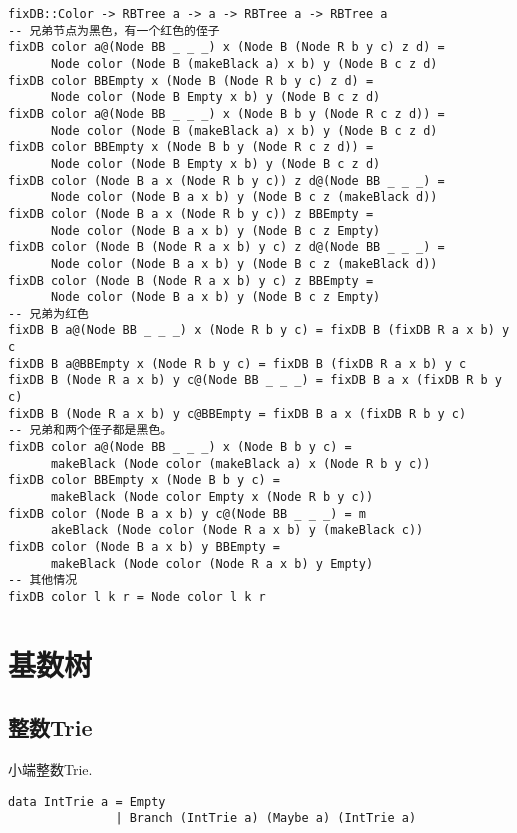 \documentclass{ctexart}
\begin{document}
\begin{lstlisting}
fixDB::Color -> RBTree a -> a -> RBTree a -> RBTree a
-- 兄弟节点为黑色，有一个红色的侄子
fixDB color a@(Node BB _ _ _) x (Node B (Node R b y c) z d) =
      Node color (Node B (makeBlack a) x b) y (Node B c z d)
fixDB color BBEmpty x (Node B (Node R b y c) z d) =
      Node color (Node B Empty x b) y (Node B c z d)
fixDB color a@(Node BB _ _ _) x (Node B b y (Node R c z d)) =
      Node color (Node B (makeBlack a) x b) y (Node B c z d)
fixDB color BBEmpty x (Node B b y (Node R c z d)) =
      Node color (Node B Empty x b) y (Node B c z d)
fixDB color (Node B a x (Node R b y c)) z d@(Node BB _ _ _) =
      Node color (Node B a x b) y (Node B c z (makeBlack d))
fixDB color (Node B a x (Node R b y c)) z BBEmpty =
      Node color (Node B a x b) y (Node B c z Empty)
fixDB color (Node B (Node R a x b) y c) z d@(Node BB _ _ _) =
      Node color (Node B a x b) y (Node B c z (makeBlack d))
fixDB color (Node B (Node R a x b) y c) z BBEmpty =
      Node color (Node B a x b) y (Node B c z Empty)
-- 兄弟为红色
fixDB B a@(Node BB _ _ _) x (Node R b y c) = fixDB B (fixDB R a x b) y c
fixDB B a@BBEmpty x (Node R b y c) = fixDB B (fixDB R a x b) y c
fixDB B (Node R a x b) y c@(Node BB _ _ _) = fixDB B a x (fixDB R b y c)
fixDB B (Node R a x b) y c@BBEmpty = fixDB B a x (fixDB R b y c)
-- 兄弟和两个侄子都是黑色。
fixDB color a@(Node BB _ _ _) x (Node B b y c) =
      makeBlack (Node color (makeBlack a) x (Node R b y c))
fixDB color BBEmpty x (Node B b y c) =
      makeBlack (Node color Empty x (Node R b y c))
fixDB color (Node B a x b) y c@(Node BB _ _ _) = m
      akeBlack (Node color (Node R a x b) y (makeBlack c))
fixDB color (Node B a x b) y BBEmpty =
      makeBlack (Node color (Node R a x b) y Empty)
-- 其他情况
fixDB color l k r = Node color l k r
\end{lstlisting}

\section{基数树}

\subsection{整数Trie}
小端整数Trie.

\lstset{language=Haskell}
\begin{lstlisting}[caption=整数Trie的代数数据类型定义]
data IntTrie a = Empty
               | Branch (IntTrie a) (Maybe a) (IntTrie a)
\end{lstlisting}
\end{document}
